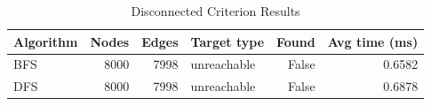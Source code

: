 \begin{table}[H]
\centering
\caption{Disconnected Criterion Results}
\begin{tabular}{lrrlrr}
\toprule
Algorithm & Nodes & Edges & Target type & Found & Avg time (ms)\\
\midrule
BFS & 8000 & 7998 & unreachable & False & 0.6582\\
DFS & 8000 & 7998 & unreachable & False & 0.6878\\
\bottomrule
\end{tabular}
\end{table}
